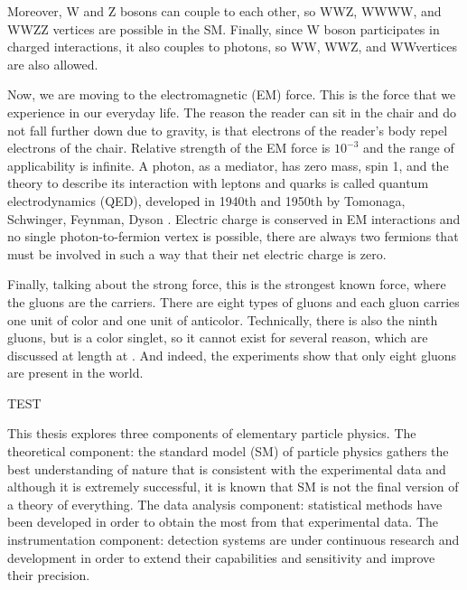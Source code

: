 Moreover, W and Z bosons can couple to each other, so WWZ, WWWW, and WWZZ vertices are possible in the SM. Finally, since W boson participates in charged interactions, it also couples to photons, so \gamma WW, \gamma WWZ, and WW\gamma\gamma vertices are also allowed.

Now, we are moving to the electromagnetic (EM) force. This is the force that we experience in our everyday life. The reason the reader can sit in the chair and do not fall further down due to gravity, is that electrons of the reader's body repel electrons of the chair. Relative strength of the EM force is $10^{-3}$ and the range of applicability is infinite. A photon, as a mediator, has zero mass, spin 1, and the theory to describe its interaction with leptons and quarks is called quantum electrodynamics (QED), developed in 1940th and 1950th by Tomonaga, Schwinger, Feynman, Dyson \cite{qed_fathers}. Electric charge is conserved in EM interactions and no single photon-to-fermion vertex is possible, there are always two fermions that must be involved in such a way that their net electric charge is zero. 

Finally, talking about the strong force, this is the strongest known force, where the gluons are the carriers. There are eight types of gluons and each gluon carries one unit of color and one unit of anticolor. Technically, there is also the ninth gluons, but is a color singlet, so it cannot exist for several reason, which are discussed at length at \cite{griffiths_hep}. And indeed, the experiments show \cite{pdg} that only eight gluons are present in the world.  

TEST
	








This thesis explores three components of elementary particle physics. The theoretical component: the standard model (SM) of particle physics gathers the best understanding of nature that is consistent with the experimental data and although it is extremely successful, it is known that SM is not the final version of a theory of everything. The data analysis component: statistical methods have been developed in order to obtain the most from that experimental data. The instrumentation component: detection systems are under continuous research and development in order to extend their capabilities and sensitivity and improve their precision. 

